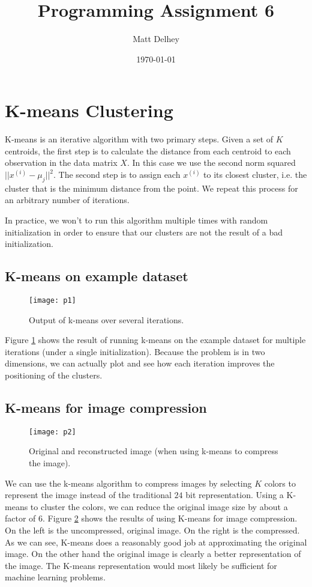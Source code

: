 \documentclass[oneside]{article}
\title{Programming Assignment 6}
\author{Matt Delhey}
\date{\today}
\begin{document}
\maketitle 

\section{K-means Clustering}
K-means is an iterative algorithm with two primary steps. Given a set
of $K$ centroids, the first step is to calculate the distance from
each centroid to each observation in the data matrix $X$. In this case
we use the second norm squared $||x^{(i)} - \mu_j||^2$. The second
step is to assign each $x^{(i)}$ to its closest cluster, i.e. the
cluster that is the minimum distance from the point. We repeat this
process for an arbitrary number of iterations.

In practice, we won't to run this algorithm multiple times with random
initialization in order to ensure that our clusters are not the result
of a bad initialization.

\subsection{K-means on example dataset}
\begin{figure}[hbtp]
  \centering
  \texttt{[image: p1]}
  \caption{Output of k-means over several iterations.}
  \label{fig:one}
\end{figure}

Figure \ref{fig:one} shows the result of running k-means on the
example dataset for multiple iterations (under a single
initialization). Because the problem is in two dimensions, we can
actually plot and see how each iteration improves the positioning of
the clusters.

\subsection{K-means for image compression}
\begin{figure}[hbtp]
  \centering
  \texttt{[image: p2]}
  \caption{Original and reconstructed image (when using k-means to
    compress the image).}
  \label{fig:two}
\end{figure}

We can use the k-means algorithm to compress images by selecting $K$
colors to represent the image instead of the traditional $24$ bit
representation. Using a K-means to cluster the colors, we can reduce
the original image size by about a factor of $6$. Figure \ref{fig:two}
shows the results of using K-means for image compression. On the left
is the uncompressed, original image. On the right is the
compressed. As we can see, K-means does a reasonably good job at
approximating the original image. On the other hand the original image
is clearly a better representation of the image. The K-means
representation would most likely be sufficient for machine learning
problems.
\end{document}

